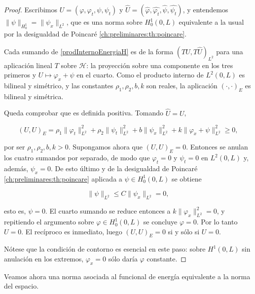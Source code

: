 \begin{proof}
    Escribimos $U = (\varphi, \varphi_t, \psi, \psi_t)$ y $\hat{U} = (\hat{\varphi}, \hat{\varphi_t}, \hat{\psi}, \hat{\psi_t})$, y entendemos $\lVert \psi \rVert_{H_0^1} = \lVert \psi_x \rVert_{L^2}$, que es una norma sobre $H_0^1(0,L)$ equivalente a la usual por la desigualdad de Poincaré \ref{ch:preliminares:th:poincare}.

    Cada sumando de \eqref{prodInternoEnergiaH} es de la forma $(TU, T\hat{U})_{L^2}$ para una aplicación lineal $T$ sobre $\mathcal{H}$: la proyección sobre una componente en los tres primeros y $U \mapsto \varphi_x + \psi$ en el cuarto. Como el producto interno de $L^2(0,L)$ es bilineal y simétrico, y las constantes $\rho_1, \rho_2, b, k$ son reales, la aplicación $(\cdot, \cdot)_E$ es bilineal y simétrica.

    Queda comprobar que es definida positiva. Tomando $\hat{U} = U$,

    \[(U,U)_E = \rho_1 \lVert \varphi_t \rVert^2_{L^2} + \rho_2 \lVert \psi_t \rVert^2_{L^2} + b \lVert \psi_x \rVert^2_{L^2} + k \lVert \varphi_x + \psi \rVert^2_{L^2} \geq 0,\]

    por ser $\rho_1, \rho_2, b, k > 0$. Supongamos ahora que $(U,U)_E = 0$. Entonces se anulan los cuatro sumandos por separado, de modo que $\varphi_t = 0$ y $\psi_t = 0$ en $L^2(0,L)$ y, además, $\psi_x = 0$. De esto último y de la desigualdad de Poincaré \ref{ch:preliminares:th:poincare} aplicada a $\psi \in H_0^1(0,L)$ se obtiene

    \[\lVert \psi \rVert_{L^2} \leq C \lVert \psi_x \rVert_{L^2} = 0,\]

    esto es, $\psi = 0$. El cuarto sumando se reduce entonces a $k\lVert \varphi_x \rVert^2_{L^2} = 0$, y repitiendo el argumento sobre $\varphi \in H_0^1(0,L)$ se concluye $\varphi = 0$. Por lo tanto $U = 0$. El recíproco es inmediato, luego $(U,U)_E = 0$ si y sólo si $U = 0$.

    Nótese que la condición de contorno es esencial en este paso: sobre $H^1(0,L)$ sin anulación en los extremos, $\varphi_x = 0$ sólo daría $\varphi$ constante.
\end{proof}

Veamos ahora una norma asociada al funcional de energía equivalente a la norma del espacio.\\

